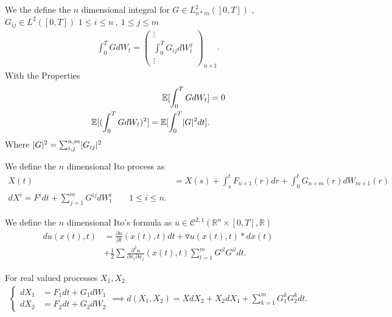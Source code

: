 \begin{definition}
  We the define the $n$ dimensional integral for $G \in  L^{2}_{n*m}([0,T]) $ , $G_{ij} \in  L^{2}([0,T])$ $1\le i\le n \ , \ 1 \le j \le m$
  \begin{align*}
    \int_0^{T} G d W_t = \begin{pmatrix} \vdots \\ \int_0^{T} G_{ij} d W^{j}_t \\ \vdots    \end{pmatrix}_{n \times 1}
  .\end{align*}
  With the Properties 
  \begin{align*}
    \mathbb{E}[\int_0^{T} G dW_t ] &= 0  \\
    \mathbb{E}[(\int_0^{T} G dW_t )^2] = \mathbb{E}[\int_0^{T} \lvert G\rvert^2 dt ]
  .\end{align*}
  Where $\lvert G\rvert^2 = \sum_{i,j}^{n,m} \lvert G_{ij}\rvert^2 $ 
\end{definition}
\begin{definition}
 We define the $n$ dimensional Ito process as  
 \begin{align*}
   X(t) &= X(s) + \int_s^{t} F_{n \times  1}(r) dr   + \int_0^{t} G_{n \times  m}(r) dW_{m \times  1}(r)  \\
   dX^{i} = F^{i} dt + \sum_{j=1}^{m} G^{ij} dW_t^i      \qquad 1\le i \le n
 .\end{align*}
\end{definition}
\begin{theorem}
  We define the $n$ dimensional Ito's formula as $u \in  \mathcal{C}^{2,1}(\mathbb{R}^{n} \times [0,T],\mathbb{R} ) $
  \begin{align*}
    du(x(t),t) &= \frac{\partial u}{\partial t}(x(t),t) dt + \triangledown u(x(t),t) * dx(t) \\
               &+ \frac{1}{2} \sum \frac{\partial ^2 u}{\partial x_i \partial x_j}(x(t),t) \sum_{l=1}^{m}  G^{il} G^{il}dt 
  .\end{align*}
\end{theorem}
\begin{prop}
  For real valued processes $X_{1},X_{2}$
 \begin{align*}
  \begin{cases}
    dX_{1} &= F_{1} dt + G_1 dW_1 \\
    d X_2 &= F_{2} dt + G_{2} dW_2
  \end{cases} \implies d(X_{1},X_{2}) = XdX_{2} + X_{2}dX_{1} + \sum_{k=1}^{m} G_1^{k} G_2^{k} dt   
 .\end{align*} 
\end{prop}
